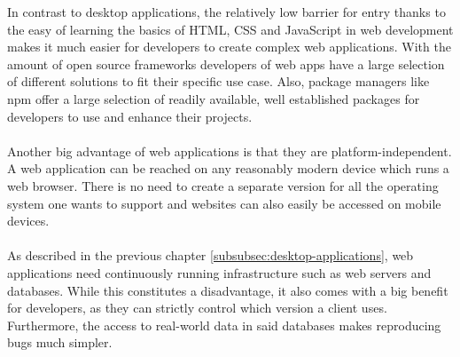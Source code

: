 
In contrast to desktop applications, the relatively low barrier for entry thanks to the easy of learning
the basics of HTML, CSS and JavaScript in web development makes it much easier for developers to create complex web applications. 
With the amount of open source frameworks developers of web apps have a large selection of different solutions to fit
their specific use case.
Also, package managers like npm offer a large selection of readily available, well established packages for developers to use
and enhance their projects.\paragraph{}
Another big advantage of web applications is that they are platform-independent. 
A web application can be reached on any reasonably modern device which runs a web browser.
There is no need to create a separate version for all the operating system one wants to support and 
websites can also easily be accessed on mobile devices.\paragraph{}
As described in the previous chapter \ref{subsubsec:desktop-applications}, web applications need continuously running infrastructure such as
web servers and databases. 
While this constitutes a disadvantage, it also comes with a big benefit for developers, as they can strictly control which version 
a client uses.
Furthermore, the access to real-world data in said databases makes reproducing bugs much simpler. \parencite{jacobs2005}